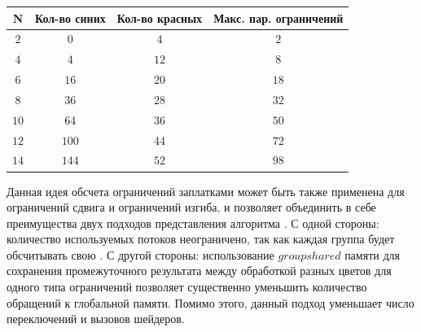 		\noindent %
	\begin{minipage}{\textwidth}
		\vspace{\mfloatsep} %
		\centering\small
		\label{tab:chunkSize}
		\begin{tabular}{|c|c|c|c|}
			\hline
			\textbf{N} & \textbf{Кол-во синих} & \textbf{Кол-во красных} & \textbf{Макс. пар. ограничений}\\
			\hline
				$2$ & $0$ & $4$ & $2$\\ \hline
				$4$ & $4$ & $12$ & $8$\\ \hline
				$6$ & $16$ & $20$ & $18$\\ \hline
				$8$ & $36$ & $28$ & $32$\\ \hline
				$10$ & $64$ & $36$ & $50$\\ \hline
				$12$ & $100$ & $44$ & $72$\\ \hline
				$14$ & $144$ & $52$ & $98$\\ \hline
			
		\end{tabular}
		\vspace{\mfloatsep} %
		\normalsize %
	\end{minipage}
	
	Данная идея обсчета ограничений заплатками может быть также применена для ограничений сдвига и ограничений изгиба, и позволяет объединить в себе преимущества двух подходов представления алгоритма . С одной стороны: количество используемых потоков неограничено, так как каждая группа будет обсчитывать свою . С другой стороны: использование $groupshared$ памяти для сохранения промежуточного результата между обработкой разных цветов для одного типа ограничений позволяет существенно уменьшить количество обращений к глобальной памяти. Помимо этого, данный подход уменьшает число переключений и вызовов шейдеров.


%
